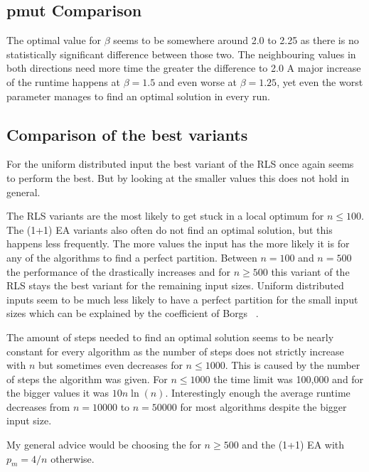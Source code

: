\subsection{pmut Comparison}

The optimal value for $\beta$ seems to be somewhere around 2.0 to 2.25 as there is no statistically significant difference between those two.
The neighbouring values in both directions need more time the greater the difference to 2.0
A major increase of the runtime happens at $\beta=1.5$ and even worse at $\beta=1.25$, yet even the worst parameter manages to find an optimal solution in every run.

\subsection{Comparison of the best variants}
For the uniform distributed input the best variant of the RLS once again seems to perform the best.
But by looking at the smaller values this does not hold in general.



The RLS variants are the most likely to get stuck in a local optimum for $n\le100$.
The (1+1) EA variants also often do not find an optimal solution, but this happens less frequently.
The more values the input has the more likely it is for any of the algorithms to find a perfect partition.
Between $n=100$ and $n=500$ the performance of the \RLSN[2] drastically increases and for $n\ge500$ this variant of the RLS stays the best variant for the remaining input sizes.
Uniform distributed inputs seem to be much less likely to have a perfect partition for the small input sizes which can be explained by the coefficient of Borgs \etal~\cite{borgs2001phase}.



The amount of steps needed to find an optimal solution seems to be nearly constant for every algorithm as the number of steps does not strictly increase with $n$ but sometimes even decreases for $n\le1000$.
This is caused by the number of steps the algorithm was given.
For $n\le1000$ the time limit was 100,000 and for the bigger values it was $10n\ln(n)$.
Interestingly enough the average runtime decreases from $n=10000$ to $n=50000$ for most algorithms despite the bigger input size.



My general advice would be choosing the \RLSN[2] for $n\ge500$ and the (1+1) EA with $p_m=4/n$ otherwise.
